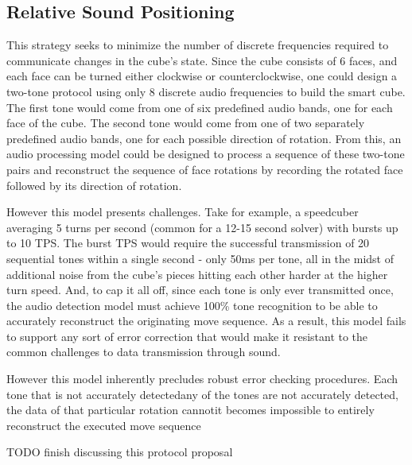 \subsection{Relative Sound Positioning}

This strategy seeks to minimize the number of discrete frequencies required to communicate changes in the cube's state. Since the cube consists of 6 faces, and each face can be turned either clockwise or counterclockwise, one could design a two-tone protocol using only 8 discrete audio frequencies to build the smart cube. The first tone would come from one of six predefined audio bands, one for each face of the cube. The second tone would come from one of two separately predefined audio bands, one for each possible direction of rotation. From this, an audio processing model could be designed to process a sequence of these two-tone pairs and reconstruct the sequence of face rotations by recording the rotated face followed by its direction of rotation.

However this model presents challenges. Take for example, a speedcuber averaging 5 turns per second (common for a 12-15 second solver) with bursts up to 10 TPS. The burst TPS would require the successful transmission of 20 sequential tones within a single second - only 50ms per tone, all in the midst of additional noise from the cube's pieces hitting each other harder at the higher turn speed. And, to cap it all off, since each tone is only ever transmitted once, the audio detection model must achieve 100\% tone recognition to be able to accurately reconstruct the originating move sequence. As a result, this model fails to support any sort of error correction that would make it resistant to the common challenges to data transmission through sound.

However this model inherently precludes robust error checking procedures. Each tone that is not accurately detectedany of the tones are not accurately detected, the data of that particular rotation cannotit becomes impossible to entirely reconstruct the executed move sequence

TODO finish discussing this protocol proposal


